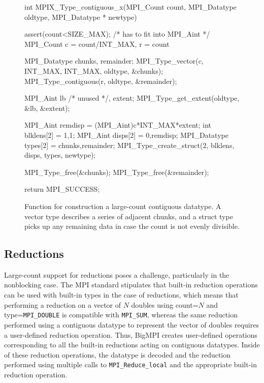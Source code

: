 \begin{figure}
\begin{code}
int MPIX_Type_contiguous_x(MPI_Count count, 
                           MPI_Datatype oldtype, 
                           MPI_Datatype * newtype)
{
    assert(count<SIZE_MAX); /* has to fit into MPI_Aint */
    MPI_Count c = count/INT_MAX, r = count%

    MPI_Datatype chunks, remainder;
    MPI_Type_vector(c, INT_MAX, INT_MAX, oldtype, &chunks);
    MPI_Type_contiguous(r, oldtype, &remainder);

    MPI_Aint lb /* unused */, extent;
    MPI_Type_get_extent(oldtype, &lb, &extent);

    MPI_Aint remdisp          = (MPI_Aint)c*INT_MAX*extent;
    int blklens[2]            = {1,1};
    MPI_Aint disps[2]         = {0,remdisp};
    MPI_Datatype types[2]     = {chunks,remainder};
    MPI_Type_create_struct(2,
    	blklens, disps, types, newtype);

    MPI_Type_free(&chunks);
    MPI_Type_free(&remainder);

    return MPI_SUCCESS;
}
\end{code}
\label{code:type_contig_x}
\caption{Function for construction a large-count contiguous datatype.
A vector type describes a series of adjacent chunks, and a struct type picks up
any remaining data in case the count is not evenly divisible.}
\end{figure}



\subsection{Reductions}
\label{sec:reductions}

Large-count support for reductions poses a challenge, particularly in the nonblocking case.
The MPI standard stipulates that built-in reduction operations can be used with built-in types
in the case of reductions, which means that performing a reduction on a vector of $N$
doubles using count=$N$ and type=\texttt{MPI\_DOUBLE} is compatible with \texttt{MPI\_SUM},
whereas the same reduction performed using a contiguous datatype to represent the vector
of doubles requires a user-defined reduction operation.
Thus, BigMPI creates user-defined operations corresponding to all the built-in reductions
acting on contiguous datatypes.  Inside of these reduction operations, the datatype is
decoded and the reduction performed using multiple calls to \texttt{MPI\_Reduce\_local}
and the appropriate built-in reduction operation.

